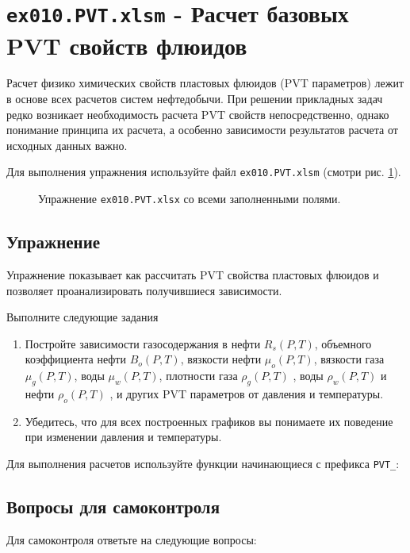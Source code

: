 \section{ \texttt{ex010.PVT.xlsm} - Расчет базовых PVT свойств флюидов}

Расчет физико химических свойств пластовых флюидов (PVT параметров) лежит в основе всех расчетов систем нефтедобычи. При решении прикладных задач редко возникает необходимость расчета PVT свойств непосредственно, однако понимание принципа их расчета, а особенно зависимости результатов расчета от исходных данных важно.
   
Для выполнения упражнения используйте файл \texttt{ex010.PVT.xlsm} (смотри рис. \ref{ris:Ex10_1}).

\begin{figure}[h!]
	\center{\texttt{[image: Ex10\_1]}}
	\caption{Упражнение \texttt{ex010.PVT.xlsx} со всеми заполненными полями.}
	\label{ris:Ex10_1}
\end{figure}

\subsection{Упражнение}
Упражнение показывает как рассчитать PVT свойства пластовых флюидов и позволяет проанализировать получившиеся зависимости. 

Выполните следующие задания
\begin{enumerate}
	\item  Постройте зависимости газосодержания в нефти $R_s(P,T)$, объемного коэффициента нефти $B_o(P,T)$, вязкости нефти $\mu_o(P,T)$, вязкости газа $\mu_g(P,T)$, воды $\mu_w(P,T)$,  плотности газа $\rho_g(P,T)$ , воды $\rho_w(P,T)$ и нефти $\rho_o(P,T)$ ,  и других PVT параметров от давления и температуры. 
	
	\item  Убедитесь, что для всех построенных графиков вы понимаете их поведение при изменении давления и температуры. 
	
\end{enumerate}

Для выполнения расчетов используйте функции \unf{} начинающиеся с префикса \texttt{PVT\_}:




\subsection{Вопросы для самоконтроля}
Для самоконтроля ответьте на следующие вопросы:

